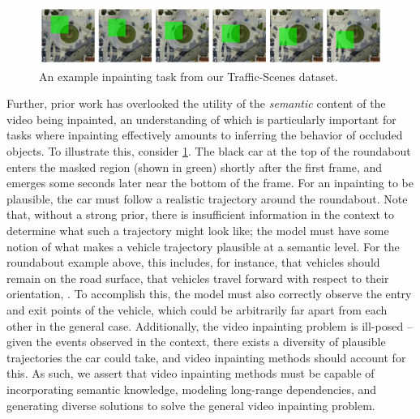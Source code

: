 \begin{figure}
\centering
\includegraphics[width=\textwidth]{figures/13269_task_only.pdf}
\caption{An example inpainting task from our Traffic-Scenes dataset. }
\label{fig:semantics}
\end{figure}
Further, prior work has overlooked the utility of the \emph{semantic} content of the video being inpainted, an understanding of which is particularly important for tasks where inpainting effectively amounts to inferring the behavior of occluded objects. To illustrate this, consider \cref{fig:semantics}. The black car at the top of the roundabout enters the masked region (shown in green) shortly after the first frame, and emerges some seconds later near the bottom of the frame. For an inpainting to be plausible, the car must follow a realistic trajectory around the roundabout. Note that, without a strong prior, there is insufficient information in the context to determine what such a trajectory might look like; the model must have some notion of what makes a vehicle trajectory plausible at a semantic level. For the roundabout example above, this includes, for instance, that vehicles should remain on the road surface, that vehicles travel forward with respect to their orientation, \etc. To accomplish this, the model must also correctly observe the entry and exit points of the vehicle, which could be arbitrarily far apart from each other in the general case. Additionally, the video inpainting problem is ill-posed -- given the events observed in the context, there exists a diversity of plausible trajectories the car could take, and video inpainting methods should account for this. As such, we assert that video inpainting methods must be capable of incorporating semantic knowledge, modeling long-range dependencies, and generating diverse solutions to solve the general video inpainting problem.

